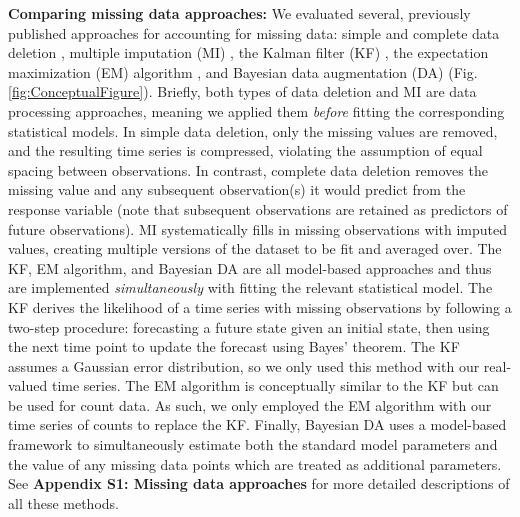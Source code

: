 \documentclass[12pt,english]{article} %
\begin{document}
\begin{linenumbers}
\begin{spacing}{1.9}
\begin{flushleft}
\textbf{Comparing missing data approaches:} We evaluated several, previously published approaches for accounting for missing data: simple and complete data deletion \citep{nakagawa_model_2011}, multiple imputation (MI) \citep{rubin1988overview}, the Kalman filter (KF) \citep{kalman_filter_1960}, the expectation maximization (EM) algorithm \citep{kang2013prevention}, and Bayesian data augmentation (DA) \citep{kong_sequential_1994} (Fig. \ref{fig:ConceptualFigure}).  Briefly, both types of data deletion and MI are data processing approaches, meaning we applied them \textit{before} fitting the corresponding statistical models. In simple data deletion, only the missing values are removed, and the resulting time series is compressed, violating the assumption of equal spacing between observations. In contrast, complete data deletion removes the missing value and any subsequent observation(s) it would predict from the response variable (note that subsequent observations are retained as predictors of future observations). MI systematically fills in missing observations with imputed values, creating multiple versions of the dataset to be fit and averaged over. The KF, EM algorithm, and Bayesian DA are all model-based approaches and thus are implemented \textit{simultaneously} with fitting the relevant statistical model. The KF derives the likelihood of a time series with missing observations by following a two-step procedure: forecasting a future state given an initial state, then using the next time point to update the forecast using Bayes’ theorem. The KF assumes a Gaussian error distribution, so we only used this method with our real-valued time series. The EM algorithm is conceptually similar to the KF but can be used for count data. As such, we only employed the EM algorithm with our time series of counts to replace the KF. Finally, Bayesian DA uses a model-based framework to simultaneously estimate both the standard model parameters and the value of any missing data points which are treated as additional parameters. See \textbf{Appendix S1: Missing data approaches} for more detailed descriptions of all these methods.


\end{flushleft}
\end{spacing}
\end{linenumbers}
\end{document}

